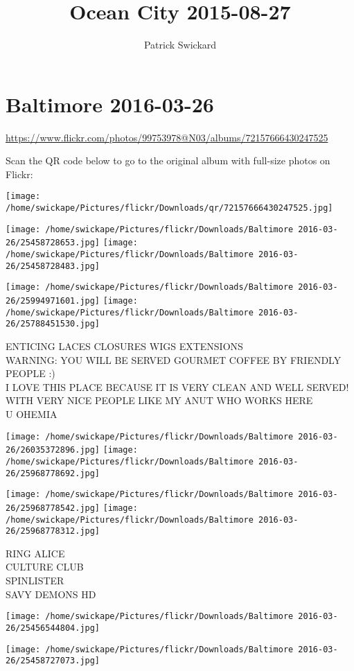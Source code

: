 \documentclass[10pt,letterpaper]{article}
\title{Ocean City 2015-08-27}
\author{Patrick Swickard}
\date{}
\begin{document}
\section*{Baltimore 2016-03-26}

\url{https://www.flickr.com/photos/99753978@N03/albums/72157666430247525}

Scan the QR code below to go to the original album with full-size photos on Flickr:

\texttt{[image: /home/swickape/Pictures/flickr/Downloads/qr/72157666430247525.jpg]}
\pagebreak

\texttt{[image: /home/swickape/Pictures/flickr/Downloads/Baltimore 2016-03-26/25458728653.jpg]}
\texttt{[image: /home/swickape/Pictures/flickr/Downloads/Baltimore 2016-03-26/25458728483.jpg]}

\texttt{[image: /home/swickape/Pictures/flickr/Downloads/Baltimore 2016-03-26/25994971601.jpg]}
\texttt{[image: /home/swickape/Pictures/flickr/Downloads/Baltimore 2016-03-26/25788451530.jpg]}

ENTICING LACES CLOSURES WIGS EXTENSIONS\\
WARNING: YOU WILL BE SERVED GOURMET COFFEE BY FRIENDLY PEOPLE :)\\
I LOVE THIS PLACE BECAUSE IT IS VERY CLEAN AND WELL SERVED!  WITH VERY NICE PEOPLE LIKE MY ANUT WHO WORKS HERE\\
U OHEMIA
\pagebreak

\texttt{[image: /home/swickape/Pictures/flickr/Downloads/Baltimore 2016-03-26/26035372896.jpg]}
\texttt{[image: /home/swickape/Pictures/flickr/Downloads/Baltimore 2016-03-26/25968778692.jpg]}

\texttt{[image: /home/swickape/Pictures/flickr/Downloads/Baltimore 2016-03-26/25968778542.jpg]}
\texttt{[image: /home/swickape/Pictures/flickr/Downloads/Baltimore 2016-03-26/25968778312.jpg]}

RING ALICE\\
CULTURE CLUB\\
SPINLISTER\\
SAVY DEMONS HD
\pagebreak

\texttt{[image: /home/swickape/Pictures/flickr/Downloads/Baltimore 2016-03-26/25456544804.jpg]}

\vspace{0.25in}
\texttt{[image: /home/swickape/Pictures/flickr/Downloads/Baltimore 2016-03-26/25458727073.jpg]}
\end{document}
